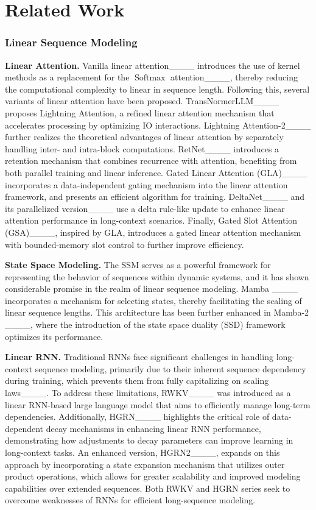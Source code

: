 \section{Related Work}
\subsubsection{Linear Sequence Modeling}

\textbf{Linear Attention.} Vanilla linear attention____ introduces the use of kernel methods as a replacement for the $\operatorname{Softmax}$ attention____, thereby reducing the computational complexity to linear in sequence length. Following this, several variants of linear attention have been proposed. TransNormerLLM____ proposes Lightning Attention, a refined linear attention mechanism that accelerates processing by optimizing IO interactions. Lightning Attention-2____ further realizes the theoretical advantages of linear attention by separately handling inter- and intra-block computations. RetNet____ introduces a retention mechanism that combines recurrence with attention, benefiting from both parallel training and linear inference. Gated Linear Attention (GLA)____ incorporates a data-independent gating mechanism into the linear attention framework, and presents an efficient algorithm for training. DeltaNet____ and its parallelized version____ use a delta rule-like update to enhance linear attention performance in long-context scenarios. Finally, Gated Slot Attention (GSA)____, inspired by GLA, introduces a gated linear attention mechanism with bounded-memory slot control to further improve efficiency.

\textbf{State Space Modeling.} The SSM serves as a powerful framework for representing the behavior of sequences within dynamic systems, and it has shown considerable promise in the realm of linear sequence modeling. Mamba ____ incorporates a mechanism for selecting states, thereby facilitating the scaling of linear sequence lengths. This architecture has been further enhanced in Mamba-2 ____, where the introduction of the state space duality (SSD) framework optimizes its performance.

\textbf{Linear RNN.} Traditional RNNs face significant challenges in handling long-context sequence modeling, primarily due to their inherent sequence dependency during training, which prevents them from fully capitalizing on scaling laws____. To address these limitations, RWKV____ was introduced as a linear RNN-based large language model that aims to efficiently manage long-term dependencies. Additionally, HGRN____ highlights the critical role of data-dependent decay mechanisms in enhancing linear RNN performance, demonstrating how adjustments to decay parameters can improve learning in long-context tasks. An enhanced version, HGRN2____, expands on this approach by incorporating a state expansion mechanism that utilizes outer product operations, which allows for greater scalability and improved modeling capabilities over extended sequences. Both RWKV and HGRN series seek to overcome weaknesses of RNNs for efficient long-sequence modeling.


